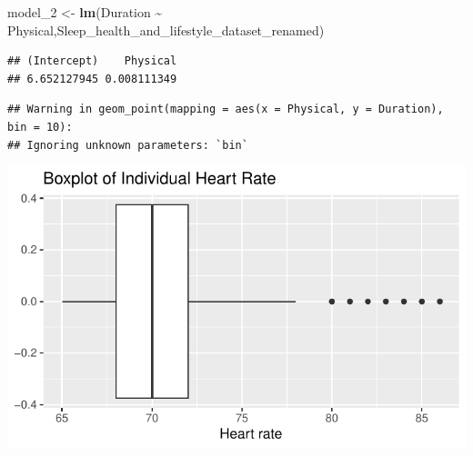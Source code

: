 \documentclass[
  11pt,
]{article}
\newenvironment{Shaded}{\begin{snugshade}}{\end{snugshade}}
\newcommand{\AttributeTok}[1]{\textcolor[rgb]{0.13,0.29,0.53}{#1}}
\newcommand{\DecValTok}[1]{\textcolor[rgb]{0.00,0.00,0.81}{#1}}
\newcommand{\FunctionTok}[1]{\textcolor[rgb]{0.13,0.29,0.53}{\textbf{#1}}}
\newcommand{\NormalTok}[1]{#1}
\newcommand{\OtherTok}[1]{\textcolor[rgb]{0.56,0.35,0.01}{#1}}
\newcommand{\SpecialCharTok}[1]{\textcolor[rgb]{0.81,0.36,0.00}{\textbf{#1}}}
\newcommand{\StringTok}[1]{\textcolor[rgb]{0.31,0.60,0.02}{#1}}
\begin{document}
\begin{Shaded}
\begin{Highlighting}[]
\NormalTok{model\_2 }\OtherTok{\textless{}{-}} \FunctionTok{lm}\NormalTok{(Duration }\SpecialCharTok{\textasciitilde{}}\NormalTok{ Physical,Sleep\_health\_and\_lifestyle\_dataset\_renamed)}
\end{Highlighting}
\end{Shaded}

\begin{Shaded}
\end{Shaded}

\begin{verbatim}
## (Intercept)    Physical 
## 6.652127945 0.008111349
\end{verbatim}

\begin{Shaded}
\end{Shaded}

\begin{verbatim}
## Warning in geom_point(mapping = aes(x = Physical, y = Duration), bin = 10):
## Ignoring unknown parameters: `bin`
\end{verbatim}

\begin{center}\includegraphics[width=0.7\linewidth]{SleepHelath_files/figure-latex/unnamed-chunk-8-1} \end{center}
\end{document}
